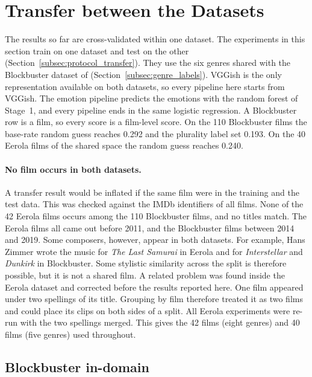 \section{Transfer between the Datasets}
\label{sec:eval_transfer}

The results so far are cross-validated within one dataset. The experiments in this section
train on one dataset and test on the other (Section~\ref{subsec:protocol_transfer}). They
use the six genres shared with the Blockbuster dataset of \citet{ma2021computational}
(Section~\ref{subsec:genre_labels}). VGGish is the only representation available on both
datasets, so every pipeline here starts from VGGish. The emotion pipeline predicts the
emotions with the random forest of Stage~1, and every pipeline ends in the same logistic
regression. A Blockbuster row is a film, so every score is a film-level score. On the 110
Blockbuster films the base-rate random guess reaches 0.292 and the plurality label set 0.193.
On the 40 Eerola films of the shared space the random guess reaches 0.240.

\paragraph{No film occurs in both datasets.} A transfer result would be inflated if the
same film were in the training and the test data. This was checked against the IMDb identifiers of all films. None of the 42 Eerola films occurs among the 110 Blockbuster
films, and no titles match. The Eerola films all came out before 2011, and the
Blockbuster films between 2014 and 2019. Some composers, however, appear in both datasets.
For example, Hans Zimmer wrote the music for \emph{The Last Samurai} in Eerola and for
\emph{Interstellar} and \emph{Dunkirk} in Blockbuster. Some stylistic similarity across the
split is therefore possible, but it is not a shared film. A related problem was found inside
the Eerola dataset and corrected before the results reported here. One film appeared under
two spellings of its title. Grouping by film therefore treated it as two films and could
place its clips on both sides of a split. All Eerola experiments were re-run with the two spellings merged. This gives the 42 films (eight genres) and 40 films (five genres) used
throughout.

\subsection{Blockbuster in-domain}

